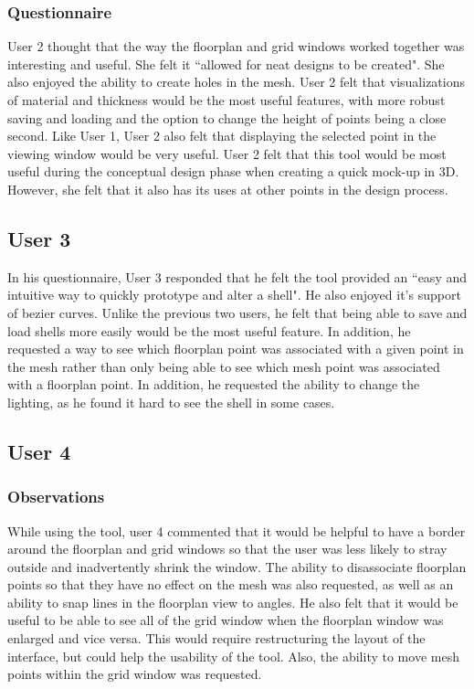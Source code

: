 \documentclass{thesis}
\begin{document}
\subsubsection{Questionnaire}
User 2 thought that the way the floorplan and grid windows worked together was interesting and useful.  She felt it ``allowed for neat
designs to be created".  She also enjoyed the ability to create holes in the mesh.  User 2 felt that visualizations of material and
thickness would be the most useful features, with more robust saving and loading and the option to change the height of points being
a close second.  Like User 1, User 2 also felt that displaying the selected point in the viewing window would be very useful.  User 2
felt that this tool would be most useful during the conceptual design phase when creating a quick mock-up in 3D.  However, she felt
that it also has its uses at other points in the design process.

\subsection{User 3}
In his questionnaire, User 3 responded that he felt the tool provided an ``easy and intuitive way to quickly prototype and alter a
shell".  He also enjoyed it's support of bezier curves.  Unlike the previous two users, he felt that being able to save and load
shells more easily would be the most useful feature.  In addition, he requested a way to see which floorplan point was associated with
a given point in the mesh rather than only being able to see which mesh point was associated with a floorplan point.  In addition, he
requested the ability to change the lighting, as he found it hard to see the shell in some cases.

\subsection{User 4}
\subsubsection{Observations}
While using the tool, user 4 commented that it would be helpful to have a border around the floorplan and grid windows so that the
user was less likely to stray outside and inadvertently shrink the window.  The ability to disassociate floorplan points so that they
have no effect on the mesh was also requested, as well as an ability to snap lines in the floorplan view to angles.  He also felt
that it would be useful to be able to see all of the grid window when the floorplan window was enlarged and vice versa.  This would
require restructuring the layout of the interface, but could help the usability of the tool.  Also, the ability to move mesh points
within the grid window was requested.
\end{document}
